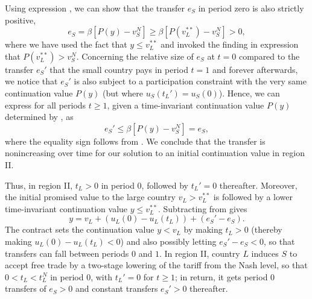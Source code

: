 Using expression , we can show that the transfer $e_S$
in period zero is also strictly positive,
$$
e_S = \beta [P(y) - v_S^N] \geq \beta \left[P(v_L^{**}) - v_S^N\right]> 0,
$$
where we have used the fact that $y \leq v_L^{**}$ and invoked the finding
in expression  that $P(v_L^{**}) > v_S^N$. Concerning
the relative size of $e_S$ at $t=0$ compared to the transfer $e_S'$ that
the small country pays in period $t=1$ and forever afterwards, we notice
that $e_S'$ is also subject to a participation constraint 
with the very same continuation value $P(y)$ (but where $u_S(t_L')=u_S(0)$).
Hence, we can express  for all periods $t\geq1$, given
a time-invariant continuation value $P(y)$ determined by
, as
$$
e_S' \leq \beta [P(y) - v_S^N] = e_S,
$$
where the equality sign follows from . We conclude
that the transfer is nonincreasing over time for our solution to an initial
continuation value in region II.

Thus, in region II, $t_L>0$ in period $0$, followed by $t_L'=0$ thereafter.
Moreover, the initial promised value to the large country $v_L > v_L^{**}$
is followed by a lower time-invariant continuation value $y \leq v_L^{**}$.
Subtracting  from  gives
$$ y= v_L + (u_L(0) - u_L(t_L)) + (e_S' - e_S).  $$
The contract sets the continuation value
 $y < v_L$ by making  $t_L >0$ (thereby making
$u_L(0) - u_L(t_L) <0$) and also possibly letting $e_S' - e_S <0$, so that
transfers can fall between periods  $0$ and $1$.
In region II, country $L$ induces $S$ to accept free trade by
a two-stage lowering of the tariff from the Nash level,
 so that $0 < t_L <t_L^N$ in period $0$,
with $t_L'=0$ for $t \geq 1$;      in return, it gets
period $0$ transfers of $e_S > 0$ and constant transfers
$e_S' > 0$ thereafter.



